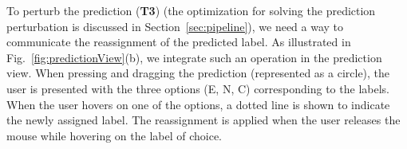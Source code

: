To perturb the prediction (\textbf{T3}) (the optimization for solving the prediction perturbation is discussed in Section~\ref{sec:pipeline}), we need a way to communicate the reassignment of the predicted label. As illustrated in Fig.~\ref{fig:predictionView}(b), we integrate such an operation in the prediction view. When pressing and dragging the prediction (represented as a circle), the user is presented with the three options (E, N, C) corresponding to the labels. When the user hovers on one of the options, a dotted line is shown to indicate the newly assigned label. The reassignment is applied when the user releases the mouse while hovering on the label of choice.


